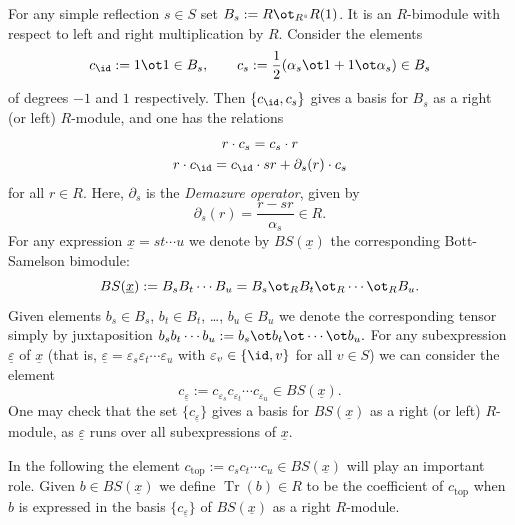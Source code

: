 \documentclass[11pt]{amsart}
\numberwithin{equation}{section}
\def\a{\alpha}
\def\e{\varepsilon}
\def\top{{\mathrm{top}}}
\DeclareMathOperator{\Tr}{Tr}
\def\un{\underline}
\theoremstyle{definition}
\theoremstyle{remark}
\begin{document}
For any simple reflection $s \in S$ set $B_s := R \ot_{R^s}
R(1)$. It is an $R$-bimodule with respect to left and right
multiplication by $R$.
Consider the elements \[ c_{\id} := 1 \ot 1 \in B_s, \quad
\quad c_s := \frac{1}{2}(\a_s \ot 1 + 1 \ot \a_s) \in B_s
\] 
of degrees $-1$ and $1$ respectively. Then $\{ c_\id, c_s \}$ gives a basis for $B_s$ as a right (or left) $R$-module, and one has the relations \begin{gather} \label{eq:invariance} r \cdot c_s = c_s \cdot r \\
\label{eq:demazure} r \cdot c_{\id} = c_{\id} \cdot sr + \partial_s(r) \cdot c_s \end{gather} for all $r \in R$. Here, $\partial_s$ is the \emph{Demazure operator}, given by \[
\partial_s(r) = \frac{r - sr}{\a_s} \in R. \]
For any expression $\un{x} = st\cdots u$ we denote by $BS(\un{x})$ the corresponding Bott-Samelson bimodule: \[ BS(\un{x}) := B_sB_t\cdots
B_u = B_s \ot_R B_t \ot_R \cdots \ot_R B_u. \] Given elements $b_s \in B_s$, $b_t \in B_t$, \dots, $b_u \in B_u$ we denote the corresponding tensor simply by juxtaposition $b_sb_t \cdots
b_u := b_s \ot b_t \ot \cdots \ot b_u.$ For any subexpression $\un{\e}$ of $\un{x}$ (that is, $\un{\e} = \e_s \e_t \cdots \e_u$ with $\e_v \in \{ \id ,v \}$ for all $v \in S$) we can
consider the element \[ c_{\un{\e}} := c_{\e_s} c_{\e_t} \cdots c_{\e_u} \in BS(\un{x}). \] One may check that the set $\{ c_{\un{\e}} \}$ gives a basis for $BS(\un{x})$ as a right (or
left) $R$-module, as $\un{\e}$ runs over all subexpressions of $\un{x}$.

In the following the element $c_\top := c_s c_t \cdots c_u \in BS(\un{x})$ will play an important role. Given $b \in BS(\un{x})$ we define $\Tr(b) \in R$ to be the coefficient of $c_\top$
when $b$ is expressed in the basis $\{ c_{\un{\e}} \}$ of $BS(\un{x})$ as a right $R$-module.
\end{document}
